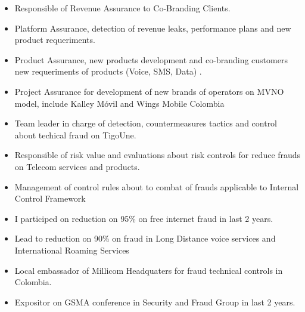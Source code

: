 \documentclass[10pt,letter]{altacv}
\begin{document}

\begin{fullwidth}
\makecvheader
\end{fullwidth}


\begin{itemize}
\item Responsible of Revenue Assurance to Co-Branding Clients.
\item Platform Assurance, detection of revenue leaks, performance plans and new product requeriments.
\item Product Assurance, new products development and co-branding customers new requeriments of products (Voice, SMS, Data) . 
\item Project Assurance for development of new brands of operators on MVNO model, include Kalley Móvil and Wings Mobile Colombia
\end{itemize}

\divider


\begin{itemize}
\item Team leader in charge of detection, countermeasures tactics and control about techical fraud on TigoUne.
\item Responsible of risk value and evaluations about risk controls for reduce frauds on Telecom services and products.
\item Management of control rules about to combat of frauds applicable to Internal Control Framework
\item I participed on reduction on 95\% on free internet fraud in last 2 years.
\item Lead to reduction on 90\% on fraud in Long Distance voice services and International Roaming Services
\item Local embassador of Millicom Headquaters for fraud technical controls in Colombia.
\item Expositor on GSMA conference in Security and Fraud Group in last 2 years.
\end{itemize}
\end{document}
